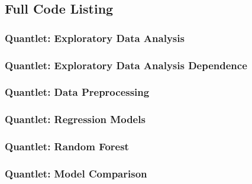 



\FloatBarrier

\subsection{Full Code Listing}
\subsubsection{Quantlet: Exploratory Data Analysis}

\subsubsection{Quantlet: Exploratory Data Analysis Dependence}

\subsubsection{Quantlet: Data Preprocessing}

\subsubsection{Quantlet: Regression Models}

\subsubsection{Quantlet: Random Forest}

\subsubsection{Quantlet: Model Comparison}

